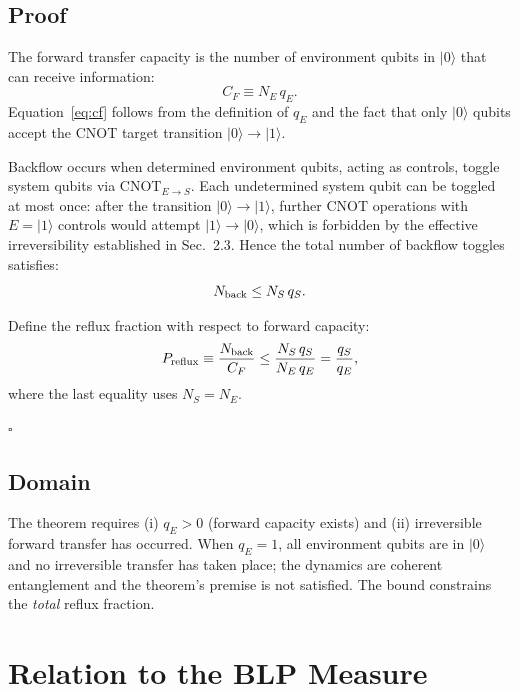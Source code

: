 \documentclass[aps,prl,twocolumn,superscriptaddress,hyperref]{revtex4-2}
\begin{document}
\subsection{Proof}

The forward transfer capacity is the number of environment qubits in $|0\rangle$ that can receive information:
\begin{equation}
C_F \equiv N_E \, q_E.
\label{eq:cf}
\end{equation}
Equation~\eqref{eq:cf} follows from the definition of $q_E$ and the fact that only $|0\rangle$ qubits accept the CNOT target transition $|0\rangle \to |1\rangle$.

Backflow occurs when determined environment qubits, acting as controls, toggle system qubits via CNOT$_{E\to S}$. Each undetermined system qubit can be toggled at most once: after the transition $|0\rangle \to |1\rangle$, further CNOT operations with $E=|1\rangle$ controls would attempt $|1\rangle \to |0\rangle$, which is forbidden by the effective irreversibility established in Sec.~2.3. Hence the total number of backflow toggles satisfies:
\begin{equation}
N_{\rm back} \leq N_S \, q_S.
\label{eq:nback}
\end{equation}

Define the reflux fraction with respect to forward capacity:
\begin{equation}
P_{\rm reflux} \equiv \frac{N_{\rm back}}{C_F}
\leq \frac{N_S \, q_S}{N_E \, q_E}
= \frac{q_S}{q_E},
\label{eq:proof}
\end{equation}
where the last equality uses $N_S = N_E$.

$\square$

\subsection{Domain}

The theorem requires (i) $q_E > 0$ (forward capacity exists) and (ii) irreversible forward transfer has occurred. When $q_E = 1$, all environment qubits are in $|0\rangle$ and no irreversible transfer has taken place; the dynamics are coherent entanglement and the theorem's premise is not satisfied. The bound constrains the \emph{total} reflux fraction.

\section{Relation to the BLP Measure}
\end{document}

